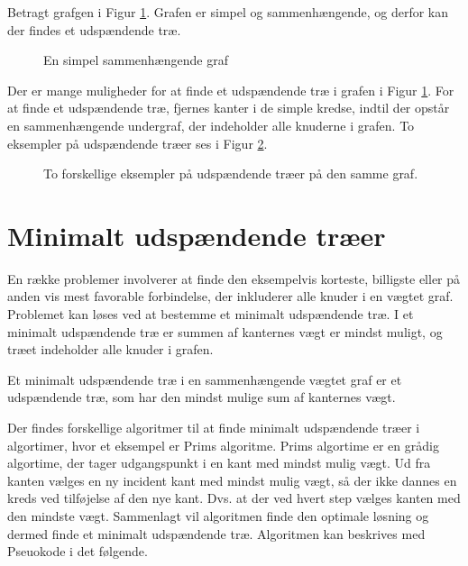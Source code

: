 \begin{exmp}
Betragt grafgen i Figur \ref{eksempel_udspaendende}. Grafen er simpel og sammenhængende, og derfor kan der findes et udspændende træ. 
\end{exmp}

\begin{figure}[h]
\centering

\caption{En simpel sammenhængende graf} 
\label{eksempel_udspaendende}
\end{figure}

Der er mange muligheder for at finde et udspændende træ i grafen i Figur \ref{eksempel_udspaendende}. For at finde et udspændende træ, fjernes kanter i de simple kredse, indtil der opstår en sammenhængende undergraf, der indeholder alle knuderne i grafen. To eksempler på udspændende træer ses i Figur \ref{eksempel_udspaendende1}.

\begin{figure}[!htb]
	\centering
	\begin{minipage}[c]{0.45\linewidth}
		\centering
		
	\end{minipage}
	\begin{minipage}[c]{.45\linewidth}
		\centering
		
	\end{minipage}
	\caption{To forskellige eksempler på udspændende træer på den samme graf.} \label{eksempel_udspaendende1}
\end{figure}

\section{Minimalt udspændende træer}

En række problemer involverer at finde den eksempelvis korteste, billigste eller på anden vis mest favorable forbindelse, der inkluderer alle knuder i en vægtet graf. Problemet kan løses ved at bestemme et minimalt udspændende træ. I et minimalt udspændende træ er summen af kanternes vægt er mindst muligt, og træet indeholder alle knuder i grafen.

\begin{defn}
Et minimalt udspændende træ i en sammenhængende vægtet graf er et udspændende træ, som har den mindst mulige sum af kanternes vægt.
\end{defn}

Der findes forskellige algoritmer til at finde minimalt udspændende træer i algortimer, hvor et eksempel er Prims algoritme. 
Prims algortime er en grådig algortime, der tager udgangspunkt i en kant med mindst mulig vægt. 
Ud fra kanten vælges en ny incident kant med mindst mulig vægt, så der ikke dannes en kreds ved tilføjelse af den nye kant. 
Dvs. at der ved hvert step vælges kanten med den mindste vægt. 
Sammenlagt vil algoritmen finde den optimale løsning og dermed finde et minimalt udspændende træ.
Algoritmen kan beskrives med Pseuokode i det følgende.
 

